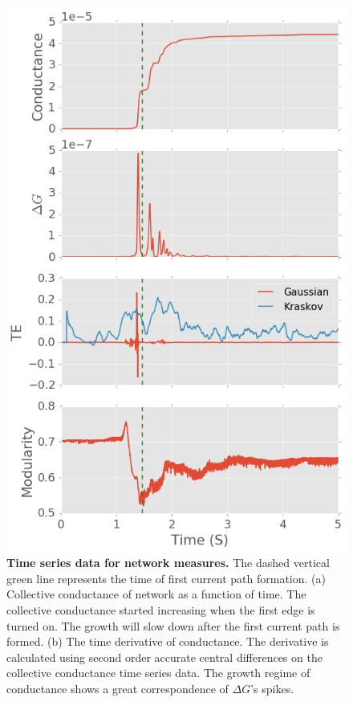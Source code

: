 \documentclass[%
 reprint,
 amsmath,amssymb,
 aps,
]{revtex4-2}
\begin{document}
\begin{figure}
	\centering
	\includegraphics[width=1\linewidth]{figure/time_series}
	\caption{\textbf{Time series data for network measures.} The dashed vertical green line represents the 			time of first current path formation.
			\newline (a) Collective conductance of network as a function of time. The collective conductance started increasing when the first edge is turned on. The growth will slow down after the first current path is formed.
			\newline (b) The time derivative of conductance. The derivative is calculated using second order accurate central differences on the collective conductance time series data. The growth regime of conductance shows a great correspondence of $\Delta G$'s spikes.
}
\end{figure}
\end{document}

